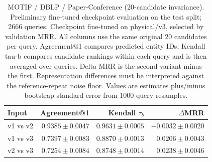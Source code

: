 \begin{table}[t]
\centering
\small
\begin{tabular}{lrrr}
\toprule
Input & Agreement@1 & Kendall $\tau_b$ & $\Delta$MRR \\
\midrule
v1 vs v2 & $0.9385 \pm 0.0047$ & $0.9631 \pm 0.0005$ & $-0.0032 \pm 0.0020$ \\
v1 vs v3 & $0.7397 \pm 0.0083$ & $0.8870 \pm 0.0013$ & $0.0206 \pm 0.0043$ \\
v2 vs v3 & $0.7254 \pm 0.0084$ & $0.8748 \pm 0.0014$ & $0.0238 \pm 0.0046$ \\
\bottomrule
\end{tabular}
\caption{MOTIF / DBLP / Paper-Conference (20-candidate invariance). Preliminary fine-tuned checkpoint evaluation on the test split; 2666 queries. Checkpoint fine-tuned on physical/v3, selected by validation MRR. All columns use the same original 20 candidates per query. Agreement@1 compares predicted entity IDs; Kendall tau-b compares candidate rankings within each query and is then averaged over queries. Delta MRR is the second variant minus the first. Representation differences must be interpreted against the reference-repeat noise floor. Values are estimates plus/minus bootstrap standard error from 1000 query resamples.}
\label{tab:motif-paper_conference-invariance}
\end{table}
